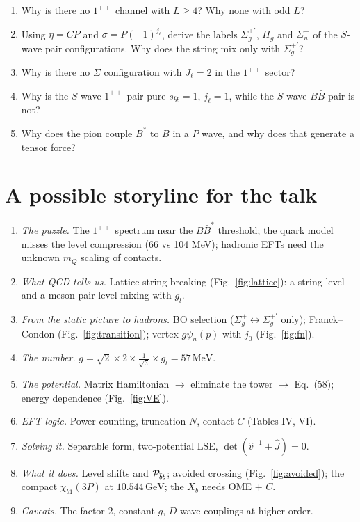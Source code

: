 \documentclass[11pt,a4paper]{article}
\newcommand{\BBst}{B\bar B^*}
\newcommand{\Pbb}{{\cal P}_{\bar bb}}
\newcommand{\GeV}{\,\mathrm{GeV}}
\newcommand{\MeV}{\,\mathrm{MeV}}
\begin{document}
\begin{enumerate}
\item Why is there no $1^{++}$ channel with $L\ge4$? Why none with odd $L$?
\item Using $\eta=CP$ and $\sigma=P(-1)^{j_\ell}$, derive the labels $\Sigma_g^{+\prime}$, $\Pi_g$ and $\Sigma_u^-$ of the $S$-wave pair configurations. Why does the string mix only with $\Sigma_g^{+\prime}$?
\item Why is there no $\Sigma$ configuration with $J_\ell=2$ in the $1^{++}$ sector?
\item Why is the $S$-wave $1^{++}$ pair pure $s_{\bar bb}=1$, $j_\ell=1$, while the $S$-wave $B\bar B$ pair is not?
\item Why does the pion couple $B^*$ to $B$ in a $P$ wave, and why does that generate a tensor force?
\end{enumerate}

\section{A possible storyline for the talk}

\begin{enumerate}
\item \emph{The puzzle.} The $1^{++}$ spectrum near the $\BBst$ threshold; the quark model misses the level compression (66 vs 104 MeV); hadronic EFTs need the unknown $m_Q$ scaling of contacts.
\item \emph{What QCD tells us.} Lattice string breaking (Fig.~\ref{fig:lattice}): a string level and a meson-pair level mixing with $g_l$.
\item \emph{From the static picture to hadrons.} BO selection ($\Sigma_g^+\leftrightarrow\Sigma_g^{+\prime}$ only); Franck--Condon (Fig.~\ref{fig:transition}); vertex $g\psi_n(p)$ with $j_0$ (Fig.~\ref{fig:fn}).
\item \emph{The number.} $g=\sqrt2\times2\times\frac1{\sqrt3}\times g_l=57\MeV$.
\item \emph{The potential.} Matrix Hamiltonian $\to$ eliminate the tower $\to$ Eq.~(58); energy dependence (Fig.~\ref{fig:VE}).
\item \emph{EFT logic.} Power counting, truncation $N$, contact $C$ (Tables IV, VI).
\item \emph{Solving it.} Separable form, two-potential LSE, $\det(\hat v^{-1}+\hat J)=0$.
\item \emph{What it does.} Level shifts and $\Pbb$; avoided crossing (Fig.~\ref{fig:avoided}); the compact $\chi_{b1}(3P)$ at $10.544\GeV$; the $X_b$ needs OME + $C$.
\item \emph{Caveats.} The factor 2, constant $g$, $D$-wave couplings at higher order.
\end{enumerate}
\end{document}
